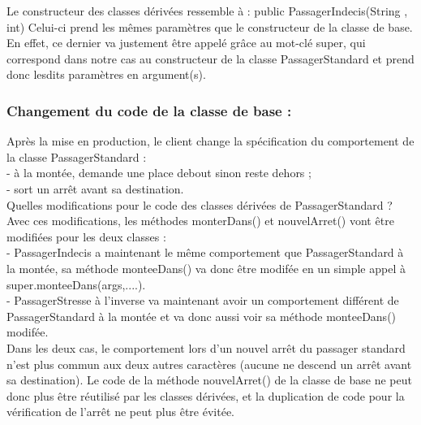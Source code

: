 \documentclass{article}
\begin{document}
Le constructeur des classes dérivées ressemble à : public PassagerIndecis(String , int) Celui-ci prend les mêmes paramètres que le constructeur de la classe de base. En effet, ce dernier va justement être appelé grâce au mot-clé super, qui correspond dans notre cas au constructeur de la classe PassagerStandard et prend donc lesdits paramètres en
argument(s).
\newline
\subsubsection{Changement du code de la classe de base : }
Après la mise en production, le client change la spécification du comportement de la classe PassagerStandard :\\
- à la montée, demande une place debout sinon reste dehors ;\\
- sort un arrêt avant sa destination.\\

Quelles modifications pour le code des classes dérivées de PassagerStandard ?\\
Avec ces modifications, les méthodes monterDans() et nouvelArret() vont être modifiées
pour les deux classes :\\
- PassagerIndecis a maintenant le même comportement que PassagerStandard à la
montée, sa méthode monteeDans() va donc être modifée en un simple appel à
super.monteeDans(args,....).
\\
- PassagerStresse à l’inverse va maintenant avoir un comportement différent de
PassagerStandard à la montée et va donc aussi voir sa méthode monteeDans()
modifée.\\
Dans les deux cas, le comportement lors d’un nouvel arrêt du passager standard n’est plus
commun aux deux autres caractères (aucune ne descend un arrêt avant sa destination). Le
code de la méthode nouvelArret() de la classe de base ne peut donc plus être réutilisé par les classes dérivées, et la duplication de code pour la vérification de l’arrêt ne peut plus être évitée.
\newline
\end{document}
